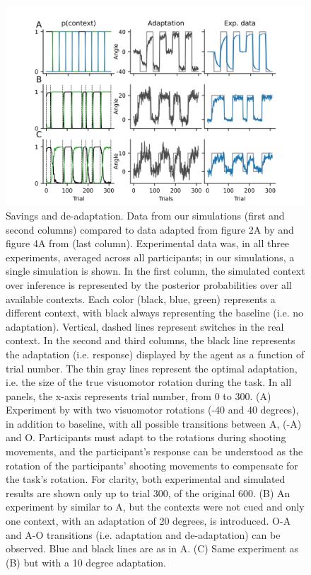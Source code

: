 \documentclass[a4paper,doc,floatsintext,natbib]{apa6}
\begin{document}
\begin{figure}
\centering
\includegraphics{./figures/figure_2.png}
\caption{Savings and de-adaptation. Data from our simulations (first and second columns) compared to data adapted from figure 2A by \cite{Kim_Neural_2015} and figure 4A from \cite{Oh_Minimizing_2019} (last column). Experimental data was, in all three experiments, averaged across all participants; in our simulations, a single simulation is shown. In the first column, the simulated context over inference is represented by the posterior probabilities over all available contexts. Each color (black, blue, green) represents a different context, with black always representing the baseline (i.e. no adaptation). Vertical, dashed lines represent switches in the real context. In the second and third columns, the black line represents the adaptation (i.e. response) displayed by the agent as a function of trial number. The thin gray lines represent the optimal adaptation, i.e. the size of the true visuomotor rotation during the task. In all panels, the x-axis represents trial number, from 0 to 300. (A) Experiment by \cite{Kim_Neural_2015} with two visuomotor rotations (-40 and 40 degrees), in addition to baseline, with all possible transitions between A, (-A) and O. Participants must adapt to the rotations during shooting movements, and the participant's response can be understood as the rotation of the participants' shooting movements to compensate for the task's rotation. For clarity, both experimental and simulated results are shown only up to trial 300, of the original 600. (B) An experiment by \cite{Oh_Minimizing_2019} similar to A, but the contexts were not cued and only one context, with an adaptation of 20 degrees, is introduced. O-A and A-O transitions (i.e. adaptation and de-adaptation) can be observed. Blue and black lines are as in A. (C) Same experiment as (B) but with a 10 degree adaptation.}
\label{fig:oh-2019}
\end{figure}
\end{document}
